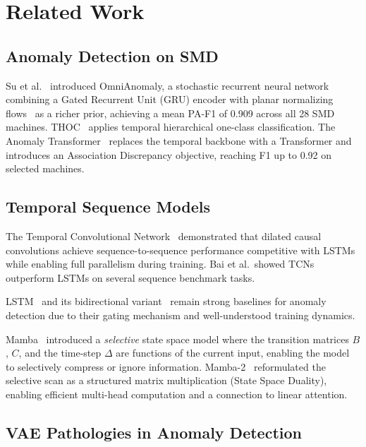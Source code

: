 \documentclass[10pt,twocolumn]{article}
\begin{document}
\section{Related Work}

\subsection{Anomaly Detection on SMD}

Su et al.~\cite{su2019robust} introduced OmniAnomaly, a stochastic recurrent
neural network combining a Gated Recurrent Unit (GRU) encoder with planar
normalizing flows~\cite{rezende2015variational} as a richer prior, achieving a
mean PA-F1 of 0.909 across all 28 SMD machines. THOC~\cite{shen2020timeseries}
applies temporal hierarchical one-class classification. The Anomaly
Transformer~\cite{xu2022anomaly} replaces the temporal backbone with a
Transformer and introduces an Association Discrepancy objective, reaching F1 up
to 0.92 on selected machines.

\subsection{Temporal Sequence Models}

The Temporal Convolutional Network~\cite{bai2018empirical} demonstrated that
dilated causal convolutions achieve sequence-to-sequence performance competitive
with LSTMs while enabling full parallelism during training. Bai et al.\ showed
TCNs outperform LSTMs on several sequence benchmark tasks.

LSTM~\cite{hochreiter1997long} and its bidirectional variant~\cite{graves2005framewise}
remain strong baselines for anomaly detection due to their gating mechanism and
well-understood training dynamics.

Mamba~\cite{gu2023mamba} introduced a \emph{selective} state space model where
the transition matrices $B$, $C$, and the time-step $\Delta$ are functions of
the current input, enabling the model to selectively compress or ignore
information. Mamba-2~\cite{dao2024transformers} reformulated the selective scan
as a structured matrix multiplication (State Space Duality), enabling efficient
multi-head computation and a connection to linear attention.

\subsection{VAE Pathologies in Anomaly Detection}
\end{document}
